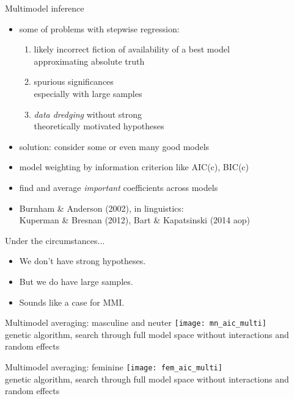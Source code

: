 \begin{frame}
	{Multimodel inference}
	\begin{itemize}
		\item some of problems with stepwise regression:
			\begin{enumerate}
				\item likely incorrect fiction of availability of a best model\\
					approximating absolute truth
				\item spurious significances\\
					\alert{especially with large samples}
				\item \textit{data dredging} without strong\\
					theoretically motivated hypotheses
			\end{enumerate}
		\item solution: consider some or even many good models
		\item model weighting by information criterion like AIC(c), BIC(c)
		\item find and average \textit{important} coefficients across models
		\item Burnham \& Anderson (2002), in linguistics:\\Kuperman \& Bresnan (2012), Bart \& Kapatsinski (2014 aop)
	\end{itemize}
\end{frame}

\begin{frame}
	{Under the circumstances...}
	\begin{itemize}
		\item We don't have strong hypotheses.
		\item But we do have large samples.
		\item Sounds like a case for MMI.
	\end{itemize}
\end{frame}

\begin{frame}
	{Multimodel averaging: masculine and neuter}
	\centering
	\texttt{[image: mn\_aic\_multi]}\\
	\tiny genetic algorithm, search through full model space without interactions and random effects
\end{frame}

\begin{frame}
	{Multimodel averaging: feminine}
	\centering
	\texttt{[image: fem\_aic\_multi]}\\
	\tiny genetic algorithm, search through full model space without interactions and random effects
\end{frame}

